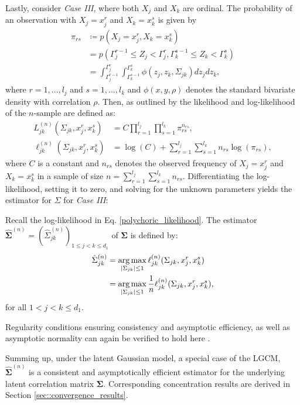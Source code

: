 Lastly, consider \textit{Case III}, where both $X_j$ and $X_k$ are ordinal. The probability of an observation with $X_j = x^r_j$ and $X_k = x^s_k$ is given by
\begin{equation}\label{cell_probabilities}
    \begin{split}
        \pi_{rs} &\coloneqq p(X_j = x^r_j, X_k = x^s_k) \\
        &= p(\Gamma_j^{r-1} \leq Z_j < \Gamma_j^r, \Gamma_k^{s-1} \leq Z_k < \Gamma_k^s) \\
        &= \int_{\Gamma_j^{r-1}}^{\Gamma_j^{r}} \int_{\Gamma_k^{s-1}}^{\Gamma_k^{s}} \phi(z_j,z_k,\Sigma_{jk}) dz_j dz_k,
    \end{split}
\end{equation}
where $r = 1, \dots, l_j$ and $s = 1, \dots, l_k$ and $\phi(x,y,\rho)$ denotes the standard bivariate density with correlation $\rho$. Then, as outlined by \citet{Olsson79} the likelihood and log-likelihood of the $n$-sample are defined as:
\begin{equation}\label{polychoric_likelihood}
    \begin{split}
        L_{jk}^{(n)}(\Sigma_{jk}, x_j^r,x_k^s) &= C \prod_{r=1}^{l_{{j}}} \prod_{s=1}^{l_{{k}}} \pi_{rs}^{n_{rs}}, \\
        \ell_{jk}^{(n)}(\Sigma_{jk}, x_j^r,x_k^s) &= \log(C) + \sum_{r=1}^{l_{{j}}}\sum_{s=1}^{l_{k}} n_{rs} \log(\pi_{rs}),
    \end{split}
\end{equation}
where $C$ is a constant and $n_{rs}$ denotes the observed frequency of $X_j = x^r_j$ and $X_k = x^s_k$ in a sample of size $n= \sum_{r=1}^{l_{{j}}}\sum_{s=1}^{l_{{k}}} n_{rs}$. Differentiating the log-likelihood, setting it to zero, and solving for the unknown parameters yields the estimator for $\Sigma$ for \textit{Case III}:
\begin{definition}\label{definition_case3}
    Recall the log-likelihood in Eq. \eqref{polychoric_likelihood}. The estimator $\hat{\mathbf{\Sigma}}^{(n)} = (\hat{\Sigma}_{jk}^{(n)})_{1\leq j < k\leq d_1}$ of $\mathbf{\Sigma}$ is defined by:
    \begin{equation}
        \begin{split}
            \hat{\Sigma}_{jk}^{(n)} &= \argmax_{\Abs{\Sigma_{jk}} \leq 1} \ell_{jk}^{(n)}(\Sigma_{jk}, x_j^r,x_k^s) \\
            &= \argmax_{\Abs{\Sigma_{jk}} \leq 1} \frac{1}{n} \ell_{jk}^{(n)}(\Sigma_{jk}, x_j^r,x_k^s),
        \end{split}
    \end{equation}
    for all $1 < j < k \leq d_1 $.
\end{definition}
\noindent Regularity conditions ensuring consistency and asymptotic efficiency, as well as asymptotic normality can again be verified to hold here \citep{Wallentin17}.

Summing up, under the latent Gaussian model, a special case of the LGCM, $\hat{\mathbf{\Sigma}}^{(n)}$ is a consistent and asymptotically efficient estimator for the underlying latent correlation matrix $\mathbf{\Sigma}$. Corresponding concentration results are derived in Section \ref{sec::convergence_results}.